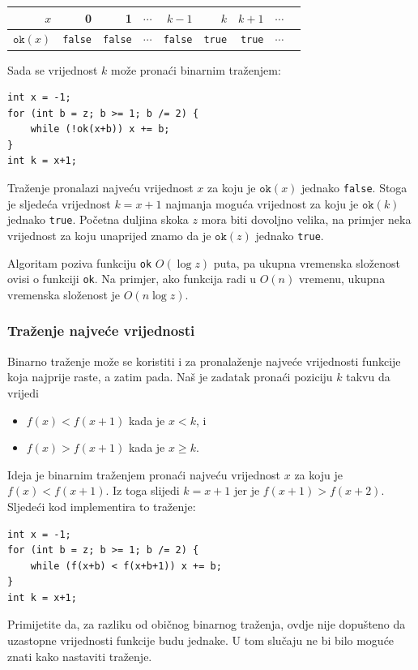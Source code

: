 \begin{center}
\begin{tabular}{r|rrrrrrrr}
$x$ & 0 & 1 & $\cdots$ & $k-1$ & $k$ & $k+1$ & $\cdots$ \\
\hline
$\texttt{ok}(x)$ & \texttt{false} & \texttt{false}
& $\cdots$ & \texttt{false} & \texttt{true} & \texttt{true} & $\cdots$ \\
\end{tabular}
\end{center}

\noindent
Sada se vrijednost $k$ može pronaći binarnim traženjem:

\begin{lstlisting}
int x = -1;
for (int b = z; b >= 1; b /= 2) {
    while (!ok(x+b)) x += b;
}
int k = x+1;
\end{lstlisting}

Traženje pronalazi najveću vrijednost $x$ za koju
je $\texttt{ok}(x)$ jednako \texttt{false}.
Stoga je sljedeća vrijednost $k=x+1$
najmanja moguća vrijednost za koju
je $\texttt{ok}(k)$ jednako \texttt{true}.
Početna duljina skoka $z$ mora biti
dovoljno velika, na primjer neka vrijednost
za koju unaprijed znamo da je $\texttt{ok}(z)$ jednako \texttt{true}.

Algoritam poziva funkciju \texttt{ok}
$O(\log z)$ puta, pa ukupna vremenska složenost
ovisi o funkciji \texttt{ok}.
Na primjer, ako funkcija radi u $O(n)$ vremenu,
ukupna vremenska složenost je $O(n \log z)$.

\subsubsection{Traženje najveće vrijednosti}

Binarno traženje može se koristiti i za pronalaženje
najveće vrijednosti funkcije koja
najprije raste, a zatim pada.
Naš je zadatak pronaći poziciju $k$ takvu da vrijedi

\begin{itemize}
\item
$f(x)<f(x+1)$ kada je $x<k$, i
\item
$f(x)>f(x+1)$ kada je $x \ge k$.
\end{itemize}

Ideja je binarnim traženjem
pronaći najveću vrijednost $x$
za koju je $f(x)<f(x+1)$.
Iz toga slijedi $k=x+1$
jer je $f(x+1)>f(x+2)$.
Sljedeći kod implementira to traženje: 

\begin{lstlisting}
int x = -1;
for (int b = z; b >= 1; b /= 2) {
    while (f(x+b) < f(x+b+1)) x += b;
}
int k = x+1;
\end{lstlisting}

Primijetite da, za razliku od običnog binarnog traženja,
ovdje nije dopušteno da uzastopne vrijednosti
funkcije budu jednake.
U tom slučaju ne bi bilo moguće znati
kako nastaviti traženje.
